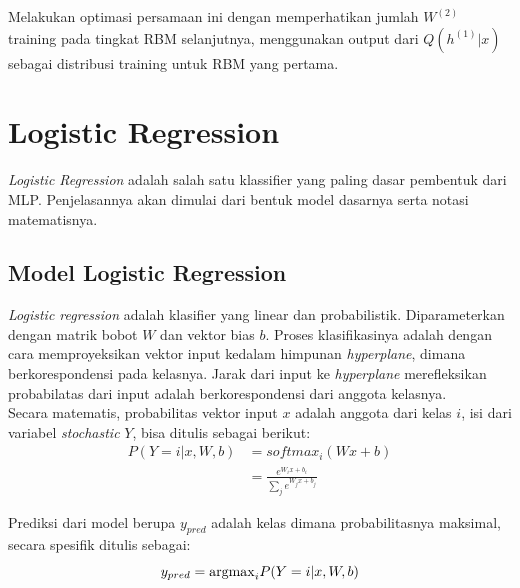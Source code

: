 Melakukan optimasi persamaan ini dengan memperhatikan jumlah $W^{(2)}$ training pada tingkat RBM selanjutnya, menggunakan output dari $Q(h^{(1)}|x)$ sebagai distribusi training untuk RBM yang pertama.

\section{Logistic Regression}
\textit{Logistic Regression} adalah salah satu klassifier yang paling dasar pembentuk dari MLP. Penjelasannya akan dimulai dari bentuk model dasarnya serta notasi matematisnya.

\subsection{Model Logistic Regression}
\textit{Logistic regression} adalah klasifier yang linear dan probabilistik. Diparameterkan dengan matrik bobot $W$ dan vektor bias $b$. Proses klasifikasinya adalah dengan cara memproyeksikan vektor input kedalam himpunan \textit{hyperplane}, dimana berkorespondensi pada kelasnya. Jarak dari input ke \textit{hyperplane} merefleksikan probabilatas dari input adalah berkorespondensi dari anggota kelasnya.\\
Secara matematis, probabilitas vektor input $x$ adalah anggota dari kelas $i$, isi dari variabel \textit{stochastic} $Y$, bisa ditulis sebagai berikut:
\begin{equation}
\begin{aligned}
P(Y=i|x, W,b) &= softmax_i(W x + b) \\
              &= \frac {e^{W_i x + b_i}} {\sum_j e^{W_j x + b_j}}
\end{aligned}
\end{equation}

Prediksi dari model berupa $y_{pred}$ adalah kelas dimana probabilitasnya maksimal, secara spesifik ditulis sebagai:
\begin{equation}
y_{pred} = {\rm argmax}_i P(Y=i|x,W,b)
\end{equation}

